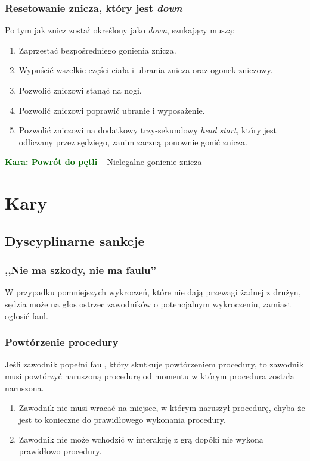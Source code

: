 \documentclass[11pt,a4paper]{article}
\newcommand\penaltyd[2]{\bgroup\textcolor{darkgreen}{\textbf{Kara: #1}} -- #2}
\begin{document}
\subsubsection{Resetowanie znicza, który jest \emph{down}}
Po tym jak znicz został określony jako \emph{down}, szukający muszą:
\begin{enumerate}
  \item Zaprzestać bezpośredniego gonienia znicza.
  \item Wypuścić wszelkie części ciała i ubrania znicza oraz ogonek zniczowy.
  \item Pozwolić zniczowi stanąć na nogi.
  \item Pozwolić zniczowi poprawić ubranie i wyposażenie.
  \item Pozwolić zniczowi na dodatkowy trzy-sekundowy \emph{head start}, który jest odliczany przez sędziego, zanim zaczną ponownie gonić znicza.
\end{enumerate}

\penaltyd{Powrót do pętli}{Nielegalne gonienie znicza}

\section{Kary}

\subsection{Dyscyplinarne sankcje}

\subsubsection{,,Nie ma szkody, nie ma faulu''}
W przypadku pomniejszych wykroczeń, które nie dają przewagi żadnej z drużyn, sędzia może na głos ostrzec zawodników o potencjalnym wykroczeniu, zamiast ogłosić faul.

\subsubsection{Powtórzenie procedury}
Jeśli zawodnik popełni faul, który skutkuje powtórzeniem procedury, to zawodnik musi powtórzyć naruszoną procedurę od momentu w którym procedura została naruszona.
\begin{enumerate}
  \item Zawodnik nie musi wracać na miejsce, w którym naruszył procedurę, chyba że jest to konieczne do prawidłowego wykonania procedury.
  \item Zawodnik nie może wchodzić w interakcję z grą dopóki nie wykona prawidłowo procedury.
\end{enumerate}
\end{document}
